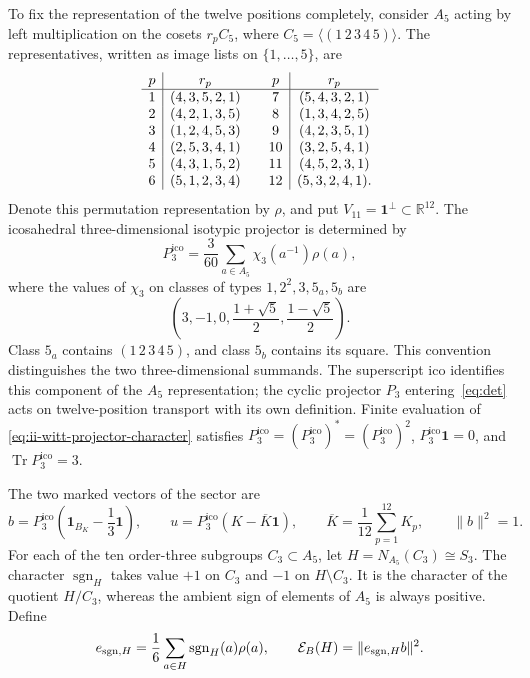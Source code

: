 To fix the representation of the twelve positions completely,
consider \(A_5\) acting by left multiplication on the
cosets \(r_pC_5\), where \(C_5=\langle(1\,2\,3\,4\,5)\rangle\).
The representatives, written as image lists on
\(\{1,\ldots,5\}\), are
\[
\begin{array}{c|c@{\qquad}c|c}
p&r_p&p&r_p\\ \hline
1&(4,3,5,2,1)&7&(5,4,3,2,1)\\
2&(4,2,1,3,5)&8&(1,3,4,2,5)\\
3&(1,2,4,5,3)&9&(4,2,3,5,1)\\
4&(2,5,3,4,1)&10&(3,2,5,4,1)\\
5&(4,3,1,5,2)&11&(4,5,2,3,1)\\
6&(5,1,2,3,4)&12&(5,3,2,4,1).
\end{array}
\]
Denote this permutation representation by \(\rho\), and put
\(V_{11}=\mathbf1^\perp\subset\mathbb R^{12}\). The icosahedral
three-dimensional isotypic projector is determined by
\begin{equation}
 P_3^{\mathrm{ico}}=\frac3{60}\sum_{a\in A_5}\chi_3(a^{-1})\rho(a),
 \label{eq:ii-witt-projector-character}
\end{equation}
where the values of \(\chi_3\) on classes of types
\(1,2^2,3,5_a,5_b\) are
\[
 \left(3,-1,0,\frac{1+\sqrt5}{2},\frac{1-\sqrt5}{2}\right).
\]
Class \(5_a\) contains \((1\,2\,3\,4\,5)\), and class
\(5_b\) contains its square. This convention distinguishes the two
three-dimensional summands. The superscript \(\mathrm{ico}\) identifies
this component of the \(A_5\) representation; the cyclic projector
\(P_3\) entering~\eqref{eq:det} acts on twelve-position transport
with its own definition. Finite evaluation of
\eqref{eq:ii-witt-projector-character} satisfies
\(P_3^{\mathrm{ico}}=(P_3^{\mathrm{ico}})^*=(P_3^{\mathrm{ico}})^2\), \(P_3^{\mathrm{ico}}\mathbf1=0\), and
\(\operatorname{Tr}P_3^{\mathrm{ico}}=3\).

The two marked vectors of the sector are
\[
 b=P_3^{\mathrm{ico}}\left(\mathbf1_{B_K}-\frac13\mathbf1\right),
 \qquad u=P_3^{\mathrm{ico}}(K-\overline K\mathbf1),
 \qquad \overline K=\frac1{12}\sum_{p=1}^{12}K_p,
 \qquad \|b\|^2=1.
\]
For each of the ten order-three subgroups \(C_3\subset A_5\),
let \(H=N_{A_5}(C_3)\cong S_3\). The character
\(\operatorname{sgn}_H\) takes value \(+1\) on \(C_3\) and
\(-1\) on \(H\setminus C_3\). It is the character of the quotient
\(H/C_3\), whereas the ambient sign of elements of \(A_5\)
is always positive. Define
\begin{equation}
 e_{{\rm sgn},H}=\frac16\sum_{a\in H}\operatorname{sgn}_H(a)\rho(a),
 \qquad \mathcal E_B(H)=\|e_{{\rm sgn},H}b\|^2.
 \label{eq:ii-witt-energy}
\end{equation}

